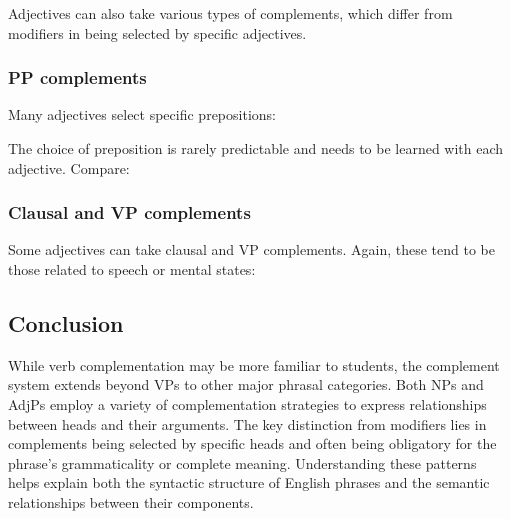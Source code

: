 Adjectives can also take various types of complements, which differ from modifiers in being selected by specific adjectives.

\subsubsection{PP complements}

Many adjectives select specific prepositions:

\ea
    \z
\z

The choice of preposition is rarely predictable and needs to be learned with each adjective. Compare:

\ea
    \z
\z

\subsubsection{Clausal and VP complements}

Some adjectives can take clausal and VP complements. Again, these tend to be those related to speech or mental states:

\ea
    \z
\z



\subsection{Conclusion}

While verb complementation may be more familiar to students, the complement system extends beyond VPs to other major phrasal categories. Both NPs and AdjPs employ a variety of complementation strategies to express relationships between heads and their arguments. The key distinction from modifiers lies in complements being selected by specific heads and often being obligatory for the phrase's grammaticality or complete meaning. Understanding these patterns helps explain both the syntactic structure of English phrases and the semantic relationships between their components.

